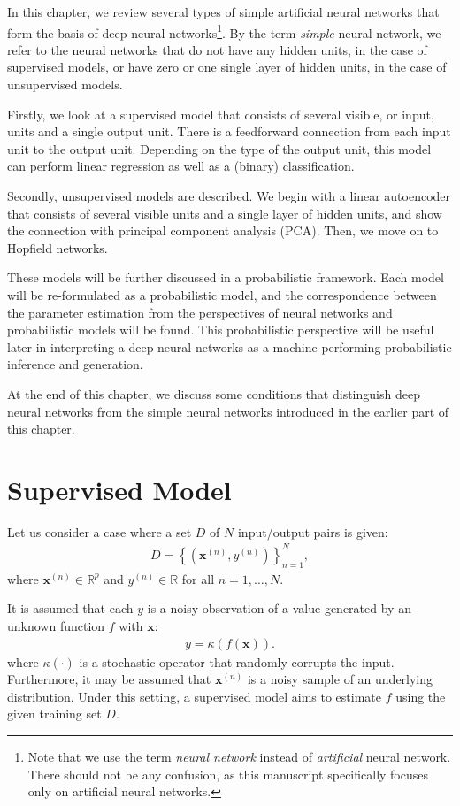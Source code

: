 \documentclass{now}
\newcommand{\vect}[1]{\mathbf{#1}}
\newcommand{\vx}[0]{\vect{x}}
\newcommand{\RR}[0]{\mathbb{R}}
\begin{document}
In this chapter, we review several types of simple artificial neural networks
that form the basis of deep neural networks\footnote{Note that we use the term
    \textit{neural network} instead of \textit{artificial} neural network.
    There should not be any confusion, as this manuscript specifically focuses only
on artificial neural networks.}. By the term \textit{simple} neural network, we
refer to the neural networks that do not have any hidden units, in the case of
supervised models, or have zero or one single layer of hidden units, in the
case of unsupervised models.

Firstly, we look at a supervised model that consists of several visible, or
input, units and a single output unit. There is a feedforward connection from
each input unit to the output unit.  Depending on the type of the output unit,
this model can perform linear regression as well as a (binary) classification.

Secondly, unsupervised models are described. We begin with a linear autoencoder
that consists of several visible units and a single layer of hidden units, and
show the connection with principal component analysis (PCA). Then, we move on
to Hopfield networks.

These models will be further discussed in a probabilistic framework.  Each
model will be re-formulated as a probabilistic model, and the correspondence
between the parameter estimation from the perspectives of neural networks and
probabilistic models will be found. This probabilistic perspective will be
useful later in interpreting a deep neural networks as a machine performing
probabilistic inference and generation.

At the end of this chapter, we discuss some conditions that distinguish deep
neural networks from the simple neural networks introduced in the earlier part
of this chapter.

\section{Supervised Model}
\label{sec:supervised_model}

Let us consider a case where a set $D$ of $N$ input/output pairs is given:
\begin{align}
    \label{eq:set_disc}
    D=\left\{ \left( \vx^{(n)}, y^{(n)} \right) \right\}_{n=1}^N,
\end{align}
where $\vx^{(n)} \in \RR^p$ and $y^{(n)} \in \RR$ for all $n=1,\dots,N$.

It is assumed that each $y$ is a noisy observation of a value generated by an
unknown function $f$ with $\vx$:
\begin{align}
    \label{eq:linreg_gen}
    y = \kappa(f(\vx)).
\end{align}
where $\kappa(\cdot)$ is a stochastic operator that randomly corrupts the
input.  Furthermore, it may be assumed that $\vx^{(n)}$ is a noisy sample of an
underlying distribution.  Under this setting, a supervised model aims to
estimate $f$ using the given training set $D$.
\end{document}
